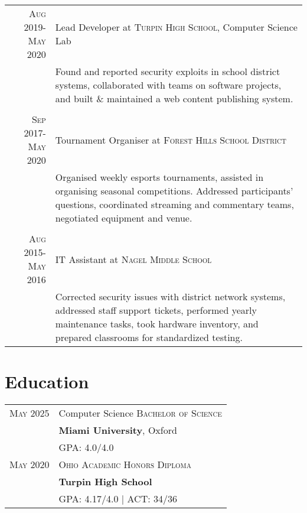 \documentclass[a4paper,10pt]{article} %
\begin{document}
\begin{tabular}{r|p{11cm}}
\textsc{Aug 2019-May 2020} & Lead Developer at \textsc{Turpin High School}, Computer Science Lab \emph{}\\
& \footnotesize{Found and reported security exploits in school district systems, collaborated with teams on software projects, and built \& maintained a web content publishing system.}\\
\multicolumn{2}{c}{} \\


\textsc{Sep 2017-May 2020} & Tournament Organiser at \textsc{Forest Hills School District} \emph{}\\
& \footnotesize{Organised weekly esports tournaments, assisted in organising seasonal competitions. Addressed participants' questions, coordinated streaming and commentary teams, negotiated equipment and venue.}\\
\multicolumn{2}{c}{} \\


\textsc{Aug 2015-May 2016} & IT Assistant at \textsc{Nagel Middle School} \emph{}\\
& \footnotesize{Corrected security issues with district network systems, addressed staff support tickets, performed yearly maintenance tasks, took hardware inventory, and prepared classrooms for standardized testing. }
\end{tabular}


\section{Education}

\begin{tabular}{rl}	
\textsc{May 2025} & Computer Science \textsc{Bachelor of Science}\\ &
\textbf{Miami University}, Oxford\\
&\normalsize \textsc{GPA}: 4.0/4.0 \\


\textsc{May 2020} & \textsc{Ohio Academic Honors Diploma}\\ &
\textbf{Turpin High School}\\
&\normalsize \textsc{GPA}: 4.17/4.0 {\hfill| \footnotesize \textsc{ACT}: 34/36}\\
\end{tabular}
\end{document}
